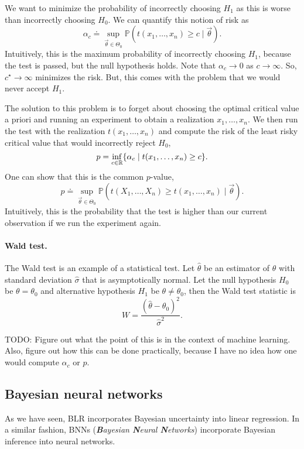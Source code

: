We want to minimize the probability of incorrectly choosing $H_1$ as this is worse than incorrectly
choosing $H_0$. We can quantify this notion of risk as \[
    \alpha_c \doteq \sup_{\vec{\theta} \in \Theta_0} \mathbb{P}(t(x_1, \ldots, x_n) \geq c \mid \vec{\theta}).
\]
Intuitively, this is the maximum probability of incorrectly choosing $H_1$, because the test is
passed, but the null hypothesis holds. Note that $\alpha_c \to 0$ as $c \to \infty$. So, $c^\star
    \to \infty$ minimizes the risk. But, this comes with the problem that we would never accept $H_1$.

The solution to this problem is to forget about choosing the optimal critical value a priori and
running an experiment to obtain a realization $x_1, \ldots, x_n$. We then run the test with the
realization $t(x_1, \ldots, x_n)$ and compute the risk of the least risky critical value that would
incorrectly reject $H_0$, \[
    p = \inf_{c \in \mathbb{R}} \{ \alpha_c \mid t(x_1, \ldots, x_n) \geq c \}.
\]
One can show that this is the common $p$-value, \[
    p \doteq \sup_{\vec{\theta} \in \Theta_0} \mathbb{P}(t(X_1, \ldots, X_n) \geq t(x_1, \ldots, x_n) \mid \vec{\theta}).
\]
Intuitively, this is the probability that the test is higher than our current observation if we run
the experiment again.

\paragraph{Wald test.}

The Wald test is an example of a statistical test. Let $\hat{\theta}$ be an estimator of $\theta$
with standard deviation $\hat{\sigma}$ that is asymptotically normal. Let the null hypothesis $H_0$
be $\theta = \theta_0$ and alternative hypothesis $H_1$ be $\theta \neq \theta_0$, then the Wald
test statistic is \[
    W = \frac{(\hat{\theta} - \theta_0)^2}{\hat{\sigma}^2}.
\]

TODO: Figure out what the point of this is in the context of machine learning. Also, figure out how
this can be done practically, because I have no idea how one would compute $\alpha_c$ or $p$.

\subsection{Bayesian neural networks}

As we have seen, BLR incorporates Bayesian uncertainty into linear regression. In a similar
fashion, BNNs (\textit{\textbf{B}ayesian \textbf{N}eural \textbf{N}etworks}) incorporate Bayesian
inference into neural networks.

